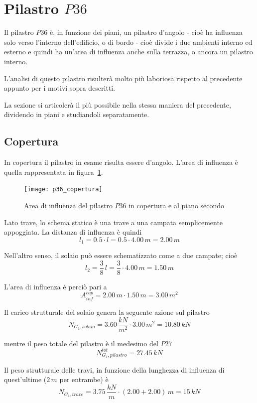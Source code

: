 \section{Pilastro $P36$}
Il pilastro $P36$ è, in funzione dei piani, un pilastro d'angolo - cioè ha influenza solo verso l'interno dell'edificio, o di bordo - cioè divide i due ambienti interno ed esterno e quindi ha un'area di influenza anche sulla terrazza, o ancora un pilastro interno.

L'analisi di questo pilastro risulterà molto più laboriosa rispetto al precedente appunto per i motivi sopra descritti.

La sezione si articolerà il più possibile nella stessa maniera del precedente, dividendo in piani e studiandoli separatamente.

\subsection{Copertura}
In copertura il pilastro in esame risulta essere d'angolo. L'area di influenza è quella rappresentata in figura~\ref{fig:p36infAreaCopertura}.

\begin{figure}
	\centering
	\texttt{[image: p36\_copertura]}
	\caption{Area di influenza del pilastro $P36$ in copertura e al piano secondo}
	\label{fig:p36infAreaCopertura}
\end{figure}

Lato trave, lo schema statico è una trave a una campata semplicemente appoggiata. La distanza di influenza è quindi
\[
	l_1 = 0.5\cdot l = 0.5\cdot 4.00\,m = 2.00\,m
\]

Nell'altro senso, il solaio può essere schematizzato come a due campate; cioè
\[
	l_2 = \dfrac{3}{8}\,l = \dfrac{3}{8}\cdot 4.00\,m = 1.50\,m
\]

L'area di influenza è perciò pari a
\[
	A_{inf}^{cop} = 2.00\,m \cdot 1.50\,m = 3.00\,m^2
\]

Il carico strutturale del solaio genera la seguente azione sul pilastro
\begin{equation*}
		N_{G_1, solaio} = 3.60\,\dfrac{kN}{m^2} \cdot 3.00\,m^2 = 10.80\,kN
\end{equation*}

mentre il peso totale del pilastro è il medesimo del $P27$
\[
	N_{G_1, pilastro}^{tot} = 27.45\,kN
\]

Il peso strutturale delle travi, in funzione della lunghezza di influenza di quest'ultime ($2\,m$ per entrambe) è
\[
	N_{G_1, trave} = 3.75\,\dfrac{kN}{m}\cdot (2.00 + 2.00)\,m = 15\,kN
\]

